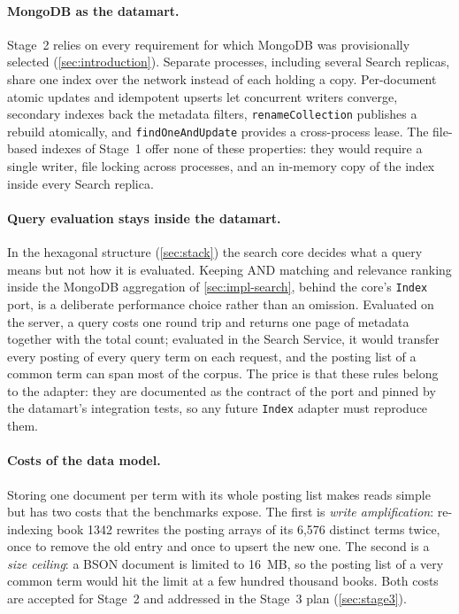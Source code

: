 \documentclass[10pt,a4paper]{article}
\newcommand{\code}[1]{\texttt{#1}}
\begin{document}
\paragraph{MongoDB as the datamart.}
Stage~2 relies on every requirement for which MongoDB was provisionally
selected (\cref{sec:introduction}). Separate processes, including several
Search replicas, share one index over the network instead of each holding a
copy. Per-document atomic updates and idempotent upserts let concurrent
writers converge, secondary indexes back the metadata filters,
\code{renameCollection} publishes a rebuild atomically, and
\code{findOneAndUpdate} provides a cross-process lease. The file-based indexes
of Stage~1 offer none of these properties: they would require a single writer,
file locking across processes, and an in-memory copy of the index inside every
Search replica.

\paragraph{Query evaluation stays inside the datamart.}
In the hexagonal structure (\cref{sec:stack}) the search core decides what a
query means but not how it is evaluated. Keeping AND matching and relevance
ranking inside the MongoDB aggregation of \cref{sec:impl-search}, behind the
core's \code{Index} port, is a deliberate performance choice rather than an
omission. Evaluated on the server, a query costs one round trip and returns one
page of metadata together with the total count; evaluated in the Search
Service, it would transfer every posting of every query term on each request,
and the posting list of a common term can span most of the corpus. The price
is that these rules belong to the adapter: they are documented as the contract
of the port and pinned by the datamart's integration tests, so any future
\code{Index} adapter must reproduce them.

\paragraph{Costs of the data model.}
Storing one document per term with its whole posting list makes reads simple
but has two costs that the benchmarks expose. The first is \emph{write
amplification}: re-indexing book 1342 rewrites the posting arrays of its 6{,}576
distinct terms twice, once to remove the old entry and once to upsert the new
one. The second is a \emph{size ceiling}: a BSON document is limited to 16~MB, so
the posting list of a very common term would hit the limit at a few hundred
thousand books. Both costs are accepted for Stage~2 and addressed in the
Stage~3 plan (\cref{sec:stage3}).
\end{document}
